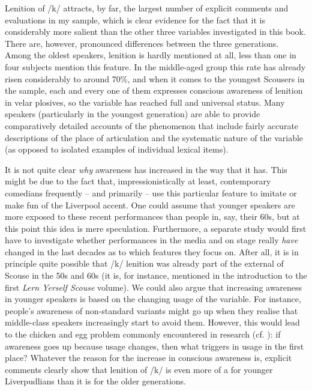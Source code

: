 Lenition of /k/ attracts, by far, the largest number of explicit comments and evaluations in my sample, which is clear evidence for the fact that it is considerably more salient than the other three variables investigated in this book.
There are, however, pronounced differences between the three generations.
Among the oldest speakers, lenition is hardly mentioned at all, less than one in four subjects mention this feature.
In the middle-aged group this rate has already risen considerably to around 70\%, and when it comes to the youngest Scousers in the sample, each and every one of them expresses conscious awareness of lenition in velar plosives, so the variable has reached full and universal  status.
Many speakers (particularly in the youngest generation) are able to provide comparatively detailed accounts of the phenomenon that include fairly accurate descriptions of the place of articulation and the systematic nature of the variable (as opposed to isolated examples of individual lexical items).

It is not quite clear \emph{why} awareness has increased in the way that it has.
This might be due to the fact that, impressionistically at least, contemporary comedians frequently -- and primarily -- use this particular feature to imitate or make fun of the Liverpool accent.
One could assume that younger speakers are more exposed to these recent performances than people in, say, their 60s, but at this point this idea is mere speculation.
Furthermore, a separate study would first have to investigate whether performances in the media and on stage really \emph{have} changed in the last decades as to which features they focus on.
After all, it is in principle quite possible that /k/ lenition was already part of the external  of Scouse in the 50s and 60s (it is, for instance, mentioned in the introduction to the first \emph{Lern Yerself Scouse} volume).
We could also argue that increasing awareness in younger speakers is based on the changing usage of the variable.
For instance, people's awareness of non-standard variants might go up when they realise that middle-class speakers increasingly start to avoid them.
However, this would lead to the chicken and egg problem commonly encountered in  research (cf. ): if awareness goes up because usage changes, then what triggers  in usage in the first place?
Whatever the reason for the increase in conscious awareness is, explicit comments clearly show that lenition of /k/ is even more of a  for younger Liverpudlians than it is for the older generations.

